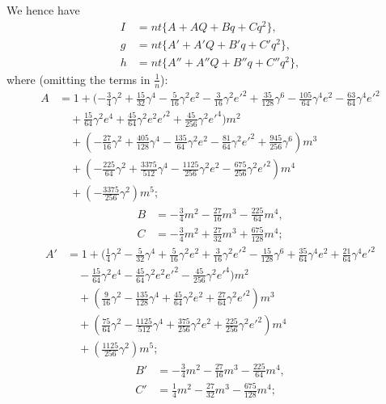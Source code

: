 \documentclass[11pt,a4paper]{article}
\theoremstyle{plain}
\theoremstyle{definition}
\theoremstyle{remark}
\begin{document}
We hence have
\begin{align*}
I &= nt\{A + AQ + Bq + Cq^{2}\},\\
g &= nt\{A' + A'Q + B'q + C'q^{2}\},\\
h &= nt\{A'' + A''Q + B''q + C''q^{2}\},
\end{align*}
where (omitting the terms in $\tfrac{1}{n}$):
\begin{align*}
A &= 1 + (-\tfrac34 \gamma^{2} + \tfrac{15}{32}\gamma^{4} - \tfrac{5}{16}\gamma^{2}e^{2} - \tfrac{3}{16}\gamma^{2}e'^{2} + \tfrac{35}{128}\gamma^{6} - \tfrac{105}{64}\gamma^{4}e^{2} - \tfrac{63}{64}\gamma^{4}e'^{2}\\
&\quad + \tfrac{15}{64}\gamma^{2}e^{4} + \tfrac{45}{64}\gamma^{2}e^{2}e'^{2} + \tfrac{45}{256}\gamma^{2}e'^{4})m^{2}\\
&\quad + (-\tfrac{27}{16}\gamma^{2} + \tfrac{405}{128}\gamma^{4} - \tfrac{135}{64}\gamma^{2}e^{2} - \tfrac{81}{64}\gamma^{2}e'^{2} + \tfrac{945}{256}\gamma^{6})m^{3}\\
&\quad + (-\tfrac{225}{64}\gamma^{2} + \tfrac{3375}{512}\gamma^{4} - \tfrac{1125}{256}\gamma^{2}e^{2} - \tfrac{675}{256}\gamma^{2}e'^{2})m^{4}\\
&\quad + (-\tfrac{3375}{256}\gamma^{2})m^{5};
\end{align*}
\begin{align*}
B &= -\tfrac34 m^{2} - \tfrac{27}{16}m^{3} - \tfrac{225}{64}m^{4},\\
C &= -\tfrac34 m^{2} + \tfrac{27}{32}m^{3} + \tfrac{675}{128}m^{4};
\end{align*}
\begin{align*}
A' &= 1 + (\tfrac14 \gamma^{2} - \tfrac{5}{32}\gamma^{4} + \tfrac{5}{16}\gamma^{2}e^{2} + \tfrac{3}{16}\gamma^{2}e'^{2} - \tfrac{15}{128}\gamma^{6} + \tfrac{35}{64}\gamma^{4}e^{2} + \tfrac{21}{64}\gamma^{4}e'^{2}\\
&\quad - \tfrac{15}{64}\gamma^{2}e^{4} - \tfrac{45}{64}\gamma^{2}e^{2}e'^{2} - \tfrac{45}{256}\gamma^{2}e'^{4})m^{2}\\
&\quad + (\tfrac{9}{16}\gamma^{2} - \tfrac{135}{128}\gamma^{4} + \tfrac{45}{64}\gamma^{2}e^{2} + \tfrac{27}{64}\gamma^{2}e'^{2})m^{3}\\
&\quad + (\tfrac{75}{64}\gamma^{2} - \tfrac{1125}{512}\gamma^{4} + \tfrac{375}{256}\gamma^{2}e^{2} + \tfrac{225}{256}\gamma^{2}e'^{2})m^{4}\\
&\quad + (\tfrac{1125}{256}\gamma^{2})m^{5};
\end{align*}
\begin{align*}
B' &= -\tfrac34 m^{2} - \tfrac{27}{16}m^{3} - \tfrac{225}{64}m^{4},\\
C' &= \tfrac14 m^{2} - \tfrac{27}{32}m^{3} - \tfrac{675}{128}m^{4};
\end{align*}
\end{document}
